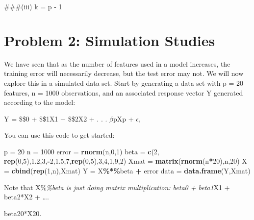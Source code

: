 \documentclass[
]{article}
\newenvironment{Shaded}{\begin{snugshade}}{\end{snugshade}}
\newcommand{\DecValTok}[1]{\textcolor[rgb]{0.00,0.00,0.81}{#1}}
\newcommand{\FloatTok}[1]{\textcolor[rgb]{0.00,0.00,0.81}{#1}}
\newcommand{\FunctionTok}[1]{\textcolor[rgb]{0.13,0.29,0.53}{\textbf{#1}}}
\newcommand{\NormalTok}[1]{#1}
\newcommand{\OtherTok}[1]{\textcolor[rgb]{0.56,0.35,0.01}{#1}}
\newcommand{\SpecialCharTok}[1]{\textcolor[rgb]{0.81,0.36,0.00}{\textbf{#1}}}
\begin{document}
\#\#\#(iii) k = p - 1

\section{Problem 2: Simulation
Studies}\label{problem-2-simulation-studies}

We have seen that as the number of features used in a model increases,
the training error will necessarily decrease, but the test error may
not. We will now explore this in a simulated data set. Start by
generating a data set with p = 20 features, n = 1000 observations, and
an associated response vector Y generated according to the model:

Y = \$\beta\$0 + \$\beta\$1X1 + \$\beta\$2X2 + . . . \(\beta\)pXp +
\(\epsilon\),

You can use this code to get started:

\begin{Shaded}
\begin{Highlighting}[]
\NormalTok{p }\OtherTok{=} \DecValTok{20}
\NormalTok{n }\OtherTok{=} \DecValTok{1000}
\NormalTok{error }\OtherTok{=} \FunctionTok{rnorm}\NormalTok{(n,}\DecValTok{0}\NormalTok{,}\DecValTok{1}\NormalTok{)}
\NormalTok{beta }\OtherTok{=} \FunctionTok{c}\NormalTok{(}\DecValTok{2}\NormalTok{, }\FunctionTok{rep}\NormalTok{(}\DecValTok{0}\NormalTok{,}\DecValTok{5}\NormalTok{),}\FloatTok{1.2}\NormalTok{,}\DecValTok{3}\NormalTok{,}\SpecialCharTok{{-}}\DecValTok{2}\NormalTok{,}\FloatTok{1.5}\NormalTok{,}\DecValTok{7}\NormalTok{,}\FunctionTok{rep}\NormalTok{(}\DecValTok{0}\NormalTok{,}\DecValTok{5}\NormalTok{),}\DecValTok{3}\NormalTok{,}\DecValTok{4}\NormalTok{,}\DecValTok{1}\NormalTok{,}\DecValTok{9}\NormalTok{,}\DecValTok{2}\NormalTok{)}
\NormalTok{Xmat }\OtherTok{=} \FunctionTok{matrix}\NormalTok{(}\FunctionTok{rnorm}\NormalTok{(n}\SpecialCharTok{*}\DecValTok{20}\NormalTok{),n,}\DecValTok{20}\NormalTok{)}
\NormalTok{X }\OtherTok{=} \FunctionTok{cbind}\NormalTok{(}\FunctionTok{rep}\NormalTok{(}\DecValTok{1}\NormalTok{,n),Xmat)}
\NormalTok{Y }\OtherTok{=}\NormalTok{ X}\SpecialCharTok{\%*\%}\NormalTok{beta }\SpecialCharTok{+}\NormalTok{ error}
\NormalTok{data }\OtherTok{=} \FunctionTok{data.frame}\NormalTok{(Y,Xmat)}
\end{Highlighting}
\end{Shaded}

Note that X\%\emph{\%beta is just doing matrix multiplication: beta0 +
beta1}X1 + beta2*X2 + \ldots.

beta20*X20.
\end{document}
